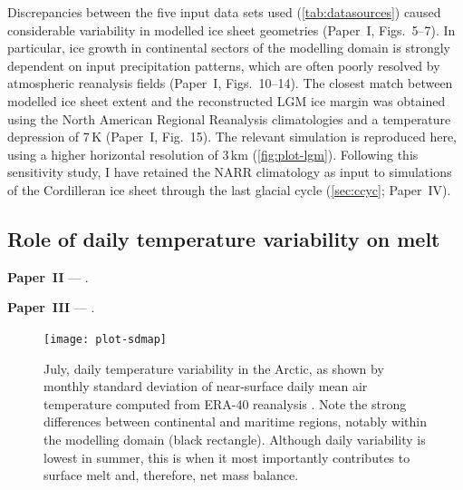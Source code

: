 \documentclass[a4paper]{kappa}
\newcommand{\CCLI}[0]{Paper~I}      %
\newcommand{\PSDV}[0]{Paper~II}     %
\newcommand{\PSDP}[0]{Paper~III}    %
\newcommand{\CCYC}[0]{Paper~IV}     %
\begin{document}
Discrepancies between the five input data sets used (\cref{tab:datasources})
caused considerable variability in modelled ice sheet geometries (\CCLI,
Figs.~5--7). In particular, ice growth in continental sectors of the modelling
domain is strongly dependent on input precipitation patterns, which are often
poorly resolved by atmospheric reanalysis fields
(\CCLI, Figs.~10--14). The closest match between modelled ice sheet extent and
the reconstructed LGM ice margin \citep{Dyke.2004} was obtained using the North
American Regional Reanalysis \citep[NARR,][]{Mesinger.etal.2006} climatologies
and a temperature depression of 7\,K (\CCLI, Fig.~15). The relevant simulation
is reproduced here, using a higher horizontal resolution of 3\,km
(\cref{fig:plot-lgm}). Following this sensitivity study, I have retained the
NARR climatology as input to simulations of the Cordilleran ice sheet through
the last glacial cycle (\cref{sec:ccyc}; \CCYC).


\subsection{Role of daily temperature variability on melt}

\noindent\textbf{\PSDV} --- .
\bigskip

\noindent\textbf{\PSDP} --- .
\bigskip

\begin{figure}
  \texttt{[image: plot-sdmap]}
  \caption{July, daily temperature variability in the Arctic, as shown by
           monthly standard deviation of near-surface daily mean air
           temperature computed from ERA-40 reanalysis
           \citep{Uppala.etal.2005}. Note the strong differences between
           continental and maritime regions, notably within the modelling domain
           (black rectangle). Although daily variability is lowest in summer,
           this is when it most importantly contributes to surface melt and,
           therefore, net mass balance.}
  \label{fig:plot-sdmap}
\end{figure}
\end{document}
